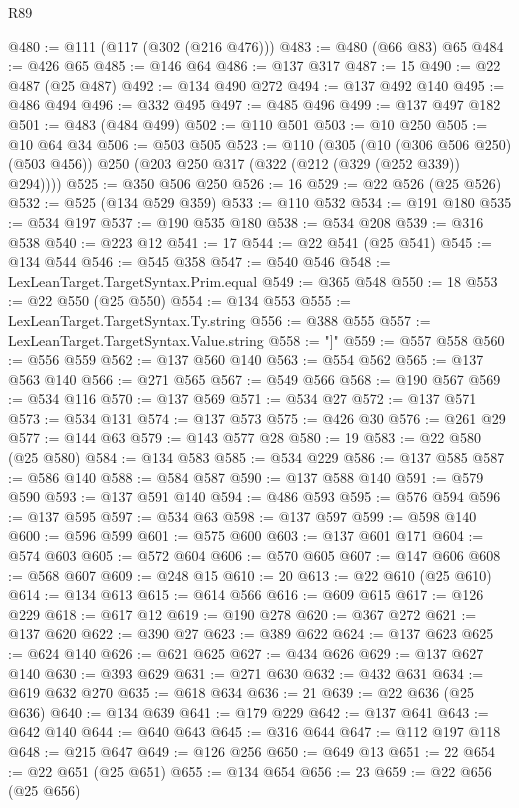 \begin{lexlean}{R89}
\begin{coremodule}
@480 := @111 (@117 (@302 (@216 @476)))
@483 := @480 (@66 @83) @65
@484 := @426 @65
@485 := @146 @64
@486 := @137 @317
@487 := 15
@490 := @22 @487 (@25 @487)
@492 := @134 @490 @272
@494 := @137 @492 @140
@495 := @486 @494
@496 := @332 @495
@497 := @485 @496
@499 := @137 @497 @182
@501 := @483 (@484 @499)
@502 := @110 @501
@503 := @10 @250
@505 := @10 @64 @34
@506 := @503 @505
@523 := @110
    (@305
      (@10 (@306 @506 @250) (@503 @456))
      @250
      (@203 @250 @317 (@322 (@212 (@329 (@252 @339)) @294))))
@525 := @350 @506 @250
@526 := 16
@529 := @22 @526 (@25 @526)
@532 := @525 (@134 @529 @359)
@533 := @110 @532
@534 := @191 @180
@535 := @534 @197
@537 := @190 @535 @180
@538 := @534 @208
@539 := @316 @538
@540 := @223 @12
@541 := 17
@544 := @22 @541 (@25 @541)
@545 := @134 @544
@546 := @545 @358
@547 := @540 @546
@548 := LexLeanTarget.TargetSyntax.Prim.equal
@549 := @365 @548
@550 := 18
@553 := @22 @550 (@25 @550)
@554 := @134 @553
@555 := LexLeanTarget.TargetSyntax.Ty.string
@556 := @388 @555
@557 := LexLeanTarget.TargetSyntax.Value.string
@558 := "]"
@559 := @557 @558
@560 := @556 @559
@562 := @137 @560 @140
@563 := @554 @562
@565 := @137 @563 @140
@566 := @271 @565
@567 := @549 @566
@568 := @190 @567
@569 := @534 @116
@570 := @137 @569
@571 := @534 @27
@572 := @137 @571
@573 := @534 @131
@574 := @137 @573
@575 := @426 @30
@576 := @261 @29
@577 := @144 @63
@579 := @143 @577 @28
@580 := 19
@583 := @22 @580 (@25 @580)
@584 := @134 @583
@585 := @534 @229
@586 := @137 @585
@587 := @586 @140
@588 := @584 @587
@590 := @137 @588 @140
@591 := @579 @590
@593 := @137 @591 @140
@594 := @486 @593
@595 := @576 @594
@596 := @137 @595
@597 := @534 @63
@598 := @137 @597
@599 := @598 @140
@600 := @596 @599
@601 := @575 @600
@603 := @137 @601 @171
@604 := @574 @603
@605 := @572 @604
@606 := @570 @605
@607 := @147 @606
@608 := @568 @607
@609 := @248 @15
@610 := 20
@613 := @22 @610 (@25 @610)
@614 := @134 @613
@615 := @614 @566
@616 := @609 @615
@617 := @126 @229
@618 := @617 @12
@619 := @190 @278
@620 := @367 @272
@621 := @137 @620
@622 := @390 @27
@623 := @389 @622
@624 := @137 @623
@625 := @624 @140
@626 := @621 @625
@627 := @434 @626
@629 := @137 @627 @140
@630 := @393 @629
@631 := @271 @630
@632 := @432 @631
@634 := @619 @632 @270
@635 := @618 @634
@636 := 21
@639 := @22 @636 (@25 @636)
@640 := @134 @639
@641 := @179 @229
@642 := @137 @641
@643 := @642 @140
@644 := @640 @643
@645 := @316 @644
@647 := @112 @197 @118
@648 := @215 @647
@649 := @126 @256
@650 := @649 @13
@651 := 22
@654 := @22 @651 (@25 @651)
@655 := @134 @654
@656 := 23
@659 := @22 @656 (@25 @656)

\end{coremodule}
\end{lexlean}
